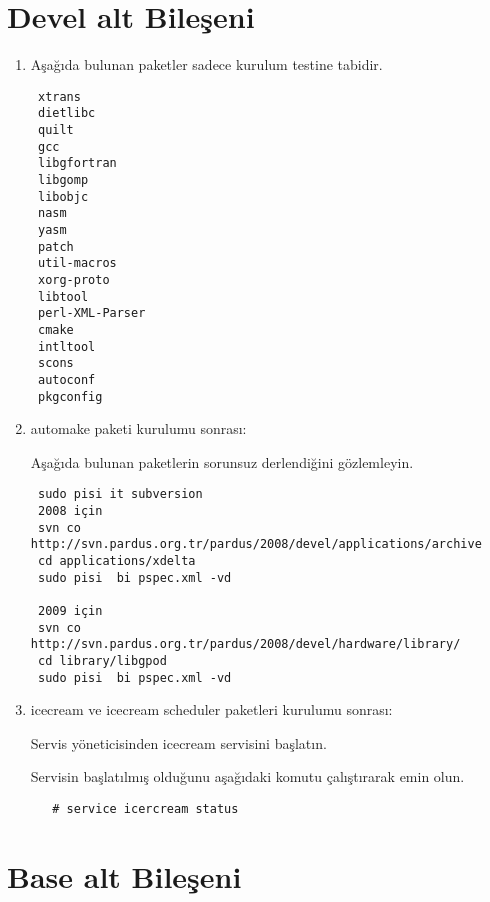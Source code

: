 \documentclass[a4paper,10pt]{article}
\begin{document}
\section{Devel alt Bileşeni}
\begin{enumerate}
 \item Aşağıda bulunan paketler sadece kurulum testine tabidir.
\begin{verbatim}
 xtrans
 dietlibc 
 quilt
 gcc
 libgfortran
 libgomp
 libobjc
 nasm
 yasm
 patch
 util-macros
 xorg-proto
 libtool
 perl-XML-Parser
 cmake
 intltool
 scons
 autoconf
 pkgconfig
\end{verbatim}
\item automake paketi kurulumu sonrası:

Aşağıda bulunan paketlerin sorunsuz derlendiğini gözlemleyin.
\begin{verbatim}
 sudo pisi it subversion
 2008 için
 svn co http://svn.pardus.org.tr/pardus/2008/devel/applications/archive
 cd applications/xdelta
 sudo pisi  bi pspec.xml -vd

 2009 için
 svn co http://svn.pardus.org.tr/pardus/2008/devel/hardware/library/
 cd library/libgpod
 sudo pisi  bi pspec.xml -vd

\end{verbatim}

 \item icecream ve icecream scheduler paketleri kurulumu sonrası:

Servis yöneticisinden icecream servisini başlatın.

Servisin başlatılmış olduğunu aşağıdaki komutu çalıştırarak emin olun.
 \begin{verbatim}
   # service icercream status
 \end{verbatim}

\end{enumerate}


\section{Base alt Bileşeni}
\end{document}

